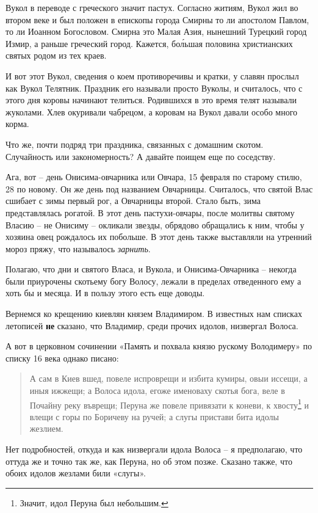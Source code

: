    Вукол в переводе с греческого значит пастух. Согласно житиям, Вукол жил во втором веке и был положен в епископы города Смирны то ли апостолом Павлом, то ли Иоанном Богословом. Смирна это Малая Азия, нынешний Турецкий город Измир, а раньше греческий город. Кажется, бо\'льшая половина христианских святых родом из тех краев.

   И вот этот Вукол, сведения о коем противоречивы и кратки, у славян прослыл как Вукол Телятник. Праздник его называли просто Вуколы, и считалось, что с этого дня коровы начинают телиться. Родившихся в это время телят называли жуколами. Хлев окуривали чабрецом, а коровам на Вукол давали особо много корма.

   Что же, почти подряд три праздника, связанных с домашним скотом. Случайность или закономерность? А давайте поищем еще по соседству.

   Ага, вот – день Онисима-овчарника или Овчара, 15 февраля по старому стилю, 28 по новому. Он же день под названием Овчарницы. Считалось, что святой Влас сшибает с зимы первый рог, а Овчарницы второй. Стало быть, зима представлялась рогатой. В этот день пастухи-овчары, после молитвы святому Власию – не Онисиму – окликали звезды, обрядово обращались к ним, чтобы у хозяина овец рождалось их побольше. В этот день также выставляли на утренний мороз пряжу, что называлось \textit{ зарнить}.

   Полагаю, что дни и святого Власа, и Вукола, и Онисима-Овчарника – некогда были приурочены скотьему богу Волосу, лежали в пределах отведенного ему а хоть бы и месяца. И в пользу этого есть еще доводы.

   Вернемся ко крещению киевлян князем Владимиром. В известных нам списках летописей \textbf{не} сказано, что Владимир, среди прочих идолов, низвергал Волоса.

   А вот в церковном сочинении «Память и похвала князю рускому Володимеру» по списку 16 века однако писано:

\begin{quotation}
А сам в Киев вшед, повеле испроврещи и избита кумиры, овыи иссещи, а иныя ижжещи; а Волоса идола, егоже именоваху скотья бога, веле в Почайну реку въврещи; Перуна же повеле привязати к коневи, к хвосту\footnote{Значит, идол Перуна был небольшим.} и влещи с горы по Боричеву на ручей; а слугы пристави бита идолы жезлием.
\end{quotation}

   Нет подробностей, откуда и как низвергали идола Волоса – я предполагаю, что оттуда же и точно так же, как Перуна, но об этом позже. Сказано также, что обоих идолов жезлами били «слугы».

